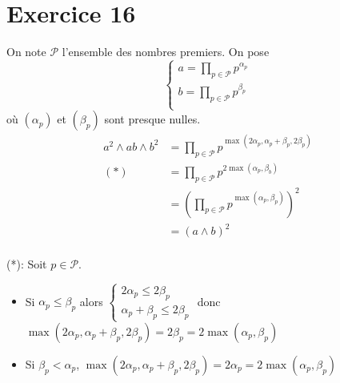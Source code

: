 \part{Exercice 16}

On note $\mathcal{P}$ l'ensemble des nombres premiers.
On pose \[
\begin{cases}
	a = \prod_{p \in \mathcal{P}} p^{\alpha_p}  \\
	b = \prod_{p \in \mathcal{P}} p^{\beta_p}  \\
\end{cases}
\] où $(\alpha_p)$ et $(\beta_p)$ sont presque nulles.\\


\begin{align*}
	a^2 \wedge ab \wedge b^2 &= \prod_{p \in \mathcal{P}} p^{\max(2\alpha_p, \alpha_p + \beta_p, 2\beta_p)}\\
	(*) &= \prod_{p \in \mathcal{P}} p^{2\max(\alpha_p, \beta_b)} \\
	&= \left( \prod_{p \in \mathcal{P}} p^{\max(\alpha_p, \beta_p)} \right)  ^2\\
	&= (a \wedge b)^2 \\
\end{align*}

(*): Soit $p \in \mathcal{P}$.\\
\begin{itemize}
	\item Si $\alpha_p \le \beta_p$ alors $\begin{cases}
			2\alpha_p \le 2\beta_p\\
			\alpha_p + \beta_p \le 2\beta_p
		\end{cases}$ 
		donc $\max(2\alpha_p, \alpha_p+\beta_p, 2\beta_p) = 2\beta_p = 2\max(\alpha_p,\beta_p)$
	\item Si $\beta_p < \alpha_p$, $\max(2\alpha_p,\alpha_p+\beta_p,2\beta_p) = 2\alpha_p = 2\max(\alpha_p,\beta_p)$
\end{itemize}
